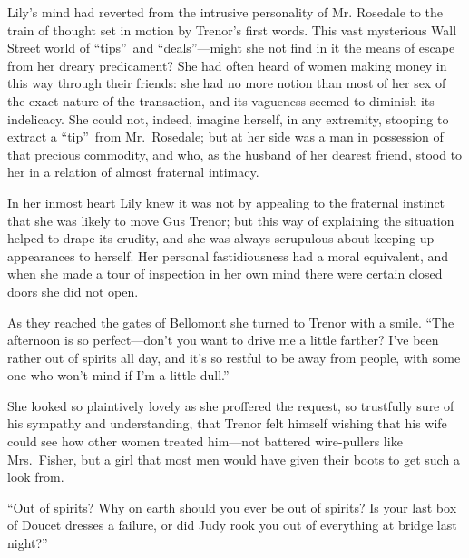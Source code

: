\documentclass[12pt,a4paper]{book}
\begin{document}
Lily's mind had reverted from the intrusive personality of Mr.
Rosedale to the train of thought set in motion by Trenor's first
words. This vast mysterious Wall Street world of ``tips''\ and
``deals''---might she not find in it the means of escape from her
dreary predicament? She had often heard of women making money in
this way through their friends: she had no more notion than most
of her sex of the exact nature of the transaction, and its
vagueness seemed to diminish its indelicacy. She could not,
indeed, imagine herself, in any extremity, stooping to extract a
``tip''\ from Mr.\ Rosedale; but at her side was a man in possession
of that precious commodity, and who, as the husband of her
dearest friend, stood to her in a relation of almost fraternal
intimacy.





In her inmost heart Lily knew it was not by appealing to the
fraternal instinct that she was likely to move Gus Trenor; but
this way of explaining the situation helped to drape its crudity,
and she was always scrupulous about keeping up appearances to
herself. Her personal fastidiousness had a moral equivalent, and
when she made a tour of inspection in her own mind there were
certain closed doors she did not open.





As they reached the gates of Bellomont she turned to Trenor with
a smile. ``The afternoon is so perfect---don't you want to drive me
a little farther? I've been rather out of spirits all day,
and it's so restful to be away from people, with some one who
won't mind if I'm a little dull.''





She looked so plaintively lovely as she proffered the request, so
trustfully sure of his sympathy and understanding, that Trenor
felt himself wishing that his wife could see how other women
treated him---not battered wire-pullers like Mrs.\ Fisher, but a
girl that most men would have given their boots to get such a
look from.





``Out of spirits? Why on earth should you ever be out of spirits? 
Is your last box of Doucet dresses a failure, or did Judy rook
you out of everything at bridge last night?''
\end{document}
